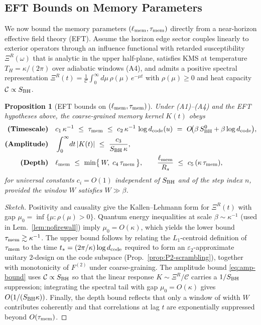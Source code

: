 \documentclass[a4paper,11pt]{article}
\theoremstyle{plain}
\newtheorem{proposition}{Proposition}
\theoremstyle{definition}
\theoremstyle{remark}
\begin{document}
\subsection{EFT Bounds on Memory Parameters} %
\label{sec:eft-bounds}
We now bound the memory parameters $(\ell_{\rm mem},\tau_{\rm mem})$ directly from a near-horizon effective field theory (EFT).
Assume the horizon edge sector couples linearly to exterior operators through an influence functional with retarded susceptibility
$\Xi^R(\omega)$ that is analytic in the upper half-plane, satisfies KMS at temperature $T_H=\kappa/(2\pi)$ over adiabatic windows
(A4), and admits a positive spectral representation $\Xi^R(t)=\frac{1}{\mathcal{C}}\int_0^\infty\!d\mu\,\rho(\mu)\,e^{-\mu t}$ with
$\rho(\mu)\ge 0$ and heat capacity $\mathcal{C}\propto S_{\rm BH}$.

\begin{proposition}[EFT bounds on $(\ell_{\rm mem},\tau_{\rm mem})$]\label{prop:eft-bounds}
Under (A1)--(A4) and the EFT hypotheses above, the coarse-grained memory kernel $K(t)$ obeys
\begin{align}
\textbf{(Timescale)}\quad & c_1\,\kappa^{-1} \ \le\ \tau_{\rm mem}
\ \le\ c_2\,\kappa^{-1}\,\log d_{\rm code}(u)\ =\ O\!\big(\beta\,S_{\rm BH}^0 + \beta\log d_{\rm code}\big), \label{eq:tau-bounds}\\
\textbf{(Amplitude)}\quad & \int_0^\infty\!dt\,|K(t)|\ \le\ \frac{c_3}{S_{\rm BH}\,\kappa}, \label{eq:amp-bound}\\
\textbf{(Depth)}\quad & \ell_{\rm mem}\ \le\ \min\!\big\{\,W,\; c_4\,\tau_{\rm mem}\,\big\},\qquad
\frac{\ell_{\rm mem}}{R_s}\ \le\ c_5\,(\kappa\,\tau_{\rm mem}), \label{eq:depth-bound}
\end{align}
for universal constants $c_i=O(1)$ independent of $S_{\rm BH}$ and of the step index $n$, provided the window $W$ satisfies $W\gg\beta$.
\end{proposition}

\begin{proof}[Sketch]
Positivity and causality give the Kallen--Lehmann form for $\Xi^R(t)$ with gap $\mu_0=\inf\{\mu:\rho(\mu)\!>\!0\}$. Quantum energy
inequalities at scale $\beta\sim\kappa^{-1}$ (used in Lem.~\ref{lem:nofirewall}) imply $\mu_0=O(\kappa)$, which yields the lower bound
$\tau_{\rm mem}\gtrsim \kappa^{-1}$. The upper bound follows by relating the $L_1$-centroid definition of $\tau_{\rm mem}$ to the time
$t_\ast=(2\pi/\kappa)\log d_{\rm code}$ required to form an $\varepsilon_2$-approximate unitary $2$-design on the code subspace (Prop.~\ref{prop:P2-scrambling}), together with monotonicity of $F^{(2)}$ under coarse-graining. The amplitude bound \eqref{eq:amp-bound} uses
$\mathcal{C}\propto S_{\rm BH}$ so that the linear response $K\!\sim\!\Xi^R/\mathcal{C}$ carries a $1/S_{\rm BH}$ suppression; integrating
the spectral tail with gap $\mu_0=O(\kappa)$ gives $O(1/(S_{\rm BH}\kappa))$. Finally, the depth bound reflects that only a window of width
$W$ contributes coherently and that correlations at lag $t$ are exponentially suppressed beyond $O(\tau_{\rm mem})$.
\end{proof}
\end{document}
